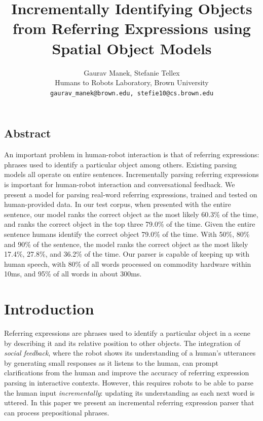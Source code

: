 \documentclass[landscape,a0b]{a0poster}
\title{\Huge Incrementally Identifying Objects from Referring Expressions using Spatial Object Models}
\author{Gaurav Manek, Stefanie Tellex \\ Humans to Robots Laboratory, Brown University \\ \texttt{gaurav\_manek@brown.edu, stefie10@cs.brown.edu}}
\date{}
\numberwithin{equation}{section}
\begin{document}
\setlength{\columnsep}{1in}
\begin{multicols*}{3}
[
\maketitle
]

\titlespacing*{\section}{0pt}{0pt}{7pt}
\thispagestyle{empty}

\begin{framed}
\section{Abstract}
An important problem in human-robot interaction is that of referring expressions: phrases used to identify a particular object among others. Existing parsing models all operate on entire sentences. Incrementally parsing referring expressions is important for human-robot interaction and conversational feedback. We present a model for parsing real-word referring expressions, trained and tested on human-provided data. In our test corpus, when presented with the entire sentence, our model ranks the correct object as the most likely 60.3\% of the time, and ranks the correct object in the top three 79.0\% of the time. Given the entire sentence humans identify the correct object 79.0\% of the time. With 50\%, 80\% and 90\% of the sentence, the model ranks the correct object as the most likely 17.4\%, 27.8\%, and 36.2\% of the time. Our parser is capable of keeping up with human speech, with 80\% of all words processed on commodity hardware within 10ms, and 95\% of all words in about 300ms.

\end{framed}



\section{Introduction}

Referring expressions are phrases used to identify a particular object in a scene by describing it and its relative position to other objects. The integration of \emph{social feedback}, where the robot shows its understanding of a human's utterances by generating small responses as it listens to the human, can prompt clarifications from the human and improve the accuracy of referring expression parsing in interactive contexts. However, this requires robots to be able to parse the human input \emph{incrementally}: updating its understanding as each next word is uttered. In this paper we present an incremental referring expression parser that can process prepositional phrases. 


\end{multicols*}
\end{document}
